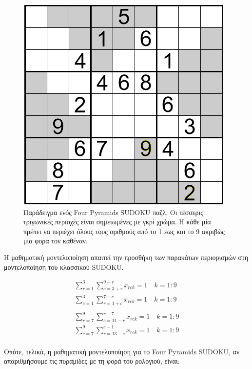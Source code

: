 \documentclass[12pt]{book}
\theoremstyle{definition}
\begin{document}
\begin{figure}[h]
	\centering
	\includegraphics[scale=0.7]{Figures/Pyramid Sudoku.png}
	\caption{Παράδειγμα ενός Four Pyramids SUDOKU παζλ. Οι τέσσερις τριγωνικές περιοχές είναι σημειωμένες με γκρί χρώμα. Η κάθε μία πρέπει να περιέχει όλους τους αριθμούς από το 1 εως και το 9 ακριβώς μία φορα τον καθέναν.}
\end{figure}

Η μαθηματική μοντελοποίηση απαιτεί την προσθήκη των παρακάτων περιορισμών στη μοντελοποίηση του κλασσικού SUDOKU.

\begin{align*}
	\sum_{r=1}^{3}{\sum_{c=3+r}^{9-r} x_{rck}} = 1 \quad k=1:9 \\
	\sum_{c=1}^{3}{\sum_{r=1+c}^{7-c} x_{rck}} = 1 \quad k=1:9 \\\\
	\sum_{r=7}^{9}{\sum_{c=11-r}^{r-7} x_{rck}} = 1 \quad k=1:9 \\
	\sum_{c=7}^{9}{\sum_{r=13-c}^{c-1} x_{rck}} = 1 \quad k=1:9 \\
\end{align*}

Οπότε, τελικά, η μαθηματική μοντελοποίηση για το Four Pyramids SUDOKU, αν απαριθμήσουμε τις πυραμίδες με τη φορά του ρολογιού, είναι:
\end{document}
